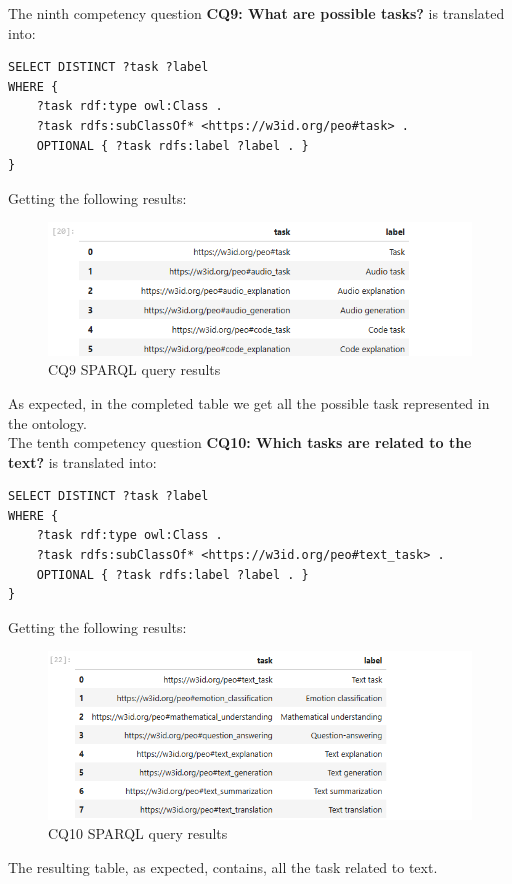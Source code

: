 The ninth competency question \textbf{CQ9: What are possible tasks?} is translated into:
\begin{lstlisting}
SELECT DISTINCT ?task ?label
WHERE {
    ?task rdf:type owl:Class .
    ?task rdfs:subClassOf* <https://w3id.org/peo#task> .
    OPTIONAL { ?task rdfs:label ?label . }
}    
\end{lstlisting}
Getting the following results:
\begin{figure}[H]
    \centering
    \includegraphics[width=0.9\linewidth]{Figures/fig_55.png}
    \caption{CQ9 SPARQL query results}
    \label{fig:enter-label}
\end{figure}
As expected, in the completed table we get all the possible task represented in the ontology.\\

The tenth competency question \textbf{CQ10: Which tasks are related to the text?} is translated into:
\begin{lstlisting}
SELECT DISTINCT ?task ?label
WHERE {
    ?task rdf:type owl:Class .
    ?task rdfs:subClassOf* <https://w3id.org/peo#text_task> .
    OPTIONAL { ?task rdfs:label ?label . }
}
\end{lstlisting}
Getting the following results:
\begin{figure}[H]
    \centering
    \includegraphics[width=0.9\linewidth]{Figures/fig_56.png}
    \caption{CQ10 SPARQL query results}
    \label{fig:enter-label}
\end{figure}

The resulting table, as expected, contains, all the task related to text.\\

